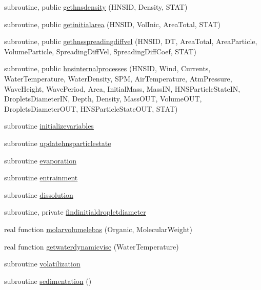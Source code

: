 \begin{DoxyCompactItemize}
subroutine, public \mbox{\hyperlink{namespacemodulehns_a4c50440c13ebd880d5f1b94bc868d428}{gethnsdensity}} (H\+N\+S\+ID, Density, S\+T\+AT)
\item 
subroutine, public \mbox{\hyperlink{namespacemodulehns_aabe546b840bff5b9fd03aff072b67385}{getinitialarea}} (H\+N\+S\+ID, Vol\+Inic, Area\+Total, S\+T\+AT)
\item 
subroutine, public \mbox{\hyperlink{namespacemodulehns_a13a7fa3be67224e60db06a75d7f0dea7}{gethnsspreadingdiffvel}} (H\+N\+S\+ID, DT, Area\+Total, Area\+Particle, Volume\+Particle, Spreading\+Diff\+Vel, Spreading\+Diff\+Coef, S\+T\+AT)
\item 
subroutine, public \mbox{\hyperlink{namespacemodulehns_a6329952c484c367d1190fff3d5a0d951}{hnsinternalprocesses}} (H\+N\+S\+ID, Wind, Currents, Water\+Temperature, Water\+Density, S\+PM, Air\+Temperature, Atm\+Pressure, Wave\+Height, Wave\+Period, Area, Initial\+Mass, Mass\+IN, H\+N\+S\+Particle\+State\+IN, Droplets\+Diameter\+IN, Depth, Density, Mass\+O\+UT, Volume\+O\+UT, Droplets\+Diameter\+O\+UT, H\+N\+S\+Particle\+State\+O\+UT, S\+T\+AT)
\item 
subroutine \mbox{\hyperlink{namespacemodulehns_a23256714b2ab17223f430aced19cdda8}{initializevariables}}
\item 
subroutine \mbox{\hyperlink{namespacemodulehns_a4966ebd0f80ed38b932eafaa93d15db4}{updatehnsparticlestate}}
\item 
subroutine \mbox{\hyperlink{namespacemodulehns_aea7fc4ad80f75c5e51fdf077a3c341c8}{evaporation}}
\item 
subroutine \mbox{\hyperlink{namespacemodulehns_a13e99017fa3f908e775b29ff9c3fee14}{entrainment}}
\item 
subroutine \mbox{\hyperlink{namespacemodulehns_a2b9b45c82fa5451490cda26d15845a31}{dissolution}}
\item 
subroutine, private \mbox{\hyperlink{namespacemodulehns_a837429821cbc45e6eb9a1c1aad7bef4e}{findinitialdropletdiameter}}
\item 
real function \mbox{\hyperlink{namespacemodulehns_a1d67c72bdca52544f6736edf0babb013}{molarvolumelebas}} (Organic, Molecular\+Weight)
\item 
real function \mbox{\hyperlink{namespacemodulehns_a0b9d738b31afba3668603a21335882f9}{getwaterdynamicvisc}} (Water\+Temperature)
\item 
subroutine \mbox{\hyperlink{namespacemodulehns_afbe73cf1017e84dcb207a4be7e224a29}{volatilization}}
\item 
subroutine \mbox{\hyperlink{namespacemodulehns_ab96db95d39d4bc3d33b5266fe71250e6}{sedimentation}} ()

\end{DoxyCompactItemize}
